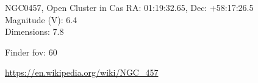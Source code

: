 \begin{block}{NGC0457, Open Cluster in Cas}
    RA: 01:19:32.65, Dec: +58:17:26.5 \\ 
    Magnitude (V): 6.4 \\ 
    Dimensions: 7.8 

    Finder fov: 60 

    \url{https://en.wikipedia.org/wiki/NGC_457} 
\end{block}